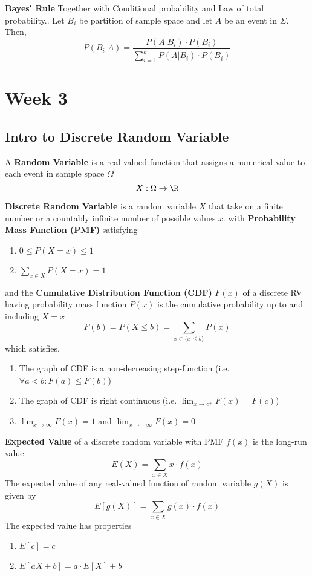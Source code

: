 \documentclass[11pt]{article}
\begin{document}
\begin{theorem}
  \textbf{Bayes' Rule} Together with Conditional probability and Law of total probability.. Let $B_i$ be partition of sample space and let $A$ be an event in $\Sigma$. Then,
  \[
    P(B_i|A) = \frac{P(A|B_i)\cdot P(B_i)}{\sum_{i=1}^k P(A|B_i) \cdot P(B_i)}
  \]
\end{theorem}


\section*{Week 3}

\subsection*{Intro to Discrete Random Variable}
\begin{defn}
  A \textbf{Random Variable} is a real-valued function that assigns a numerical value to each event in sample space $\Omega$
  \[
    X: \Omega \rightarrow \R
  \]
\end{defn}


\begin{defn}
  \textbf{Discrete Random Variable} is a random variable $X$ that take on a finite number or a countably infinite number of possible values $x$. with \textbf{Probability Mass Function (PMF)} satisfying
  \begin{enumerate}
    \item
    $0 \leq P(X=x) \leq 1$
    \item
    $\sum_{x\in X} P(X=x) = 1$
  \end{enumerate}
  and the \textbf{Cumulative Distribution Function (CDF)} $F(x)$ of a discrete RV having probability mass function $P(x)$ is the cumulative probability up to and including $X=x$
  \[
    F(b) = P(X\leq b) = \sum_{x\in \{ x\leq b\}} P(x)
  \]
  which satisfies,
  \begin{enumerate}
    \item The graph of CDF is a non-decreasing step-function (i.e. $\forall a<b: F(a) \leq F(b) $)
    \item The graph of CDF is right continuous (i.e. $\lim_{x\to c^+} F(x) = F(c)$)
    \item $\lim_{x\to \infty} F(x) = 1$ and $\lim_{x\to -\infty} F(x) = 0$
  \end{enumerate}
\end{defn}

\begin{defn}
  \textbf{Expected Value} of a discrete random variable with PMF $f(x)$ is the long-run value
  \[
    E(X) = \sum_{x\in X} x\cdot f(x)
  \]
  The expected value of any real-valued function of random variable $g(X)$ is given by
  \[
    E[g(X)] = \sum_{x\in X} g(x)\cdot f(x)
  \]
  The expected value has properties
  \begin{enumerate}
    \item $E[c] = c$
    \item $E[aX+b] = a\cdot E[X] + b$
  \end{enumerate}
\end{defn}
\end{document}
